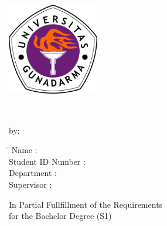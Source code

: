 \cleardoublepage
{}

\begin{titlepage}

\begin{adjustwidth}{0cm}{0cm}
\begin{center}

\large

\hfill

\vfill

\begingroup
{\LARGE
\myUniUppercase \\
\myFacultyLongUppercase \\
}
\endgroup

\vfill

\includegraphics[width=4cm]{include/gunadarma-logo} \\ \medskip

\vfill

{\LARGE
\myTitleLineOne\\
\myTitleLineTwo
}

\vfill

by:

\bigskip

\begin{minipage}[c]{\textwidth}
\begin{tabbing}
\hspace*{4cm}\=\hspace*{0.5cm}\= \kill
Name \>:\> \myName \\
Student ID Number \>:\> \myNPM \\
Department \>:\> \myDepartmentShort \\
Supervisor \>:\> \mySupervisor
\end{tabbing}
\end{minipage}

\bigskip

In Partial Fullfillment of the Requirements\\
for the Bachelor Degree (S1)

\bigskip

\myCityUppercase \\
\myYear \\

\vfill

\end{center}
\end{adjustwidth}

\end{titlepage}
